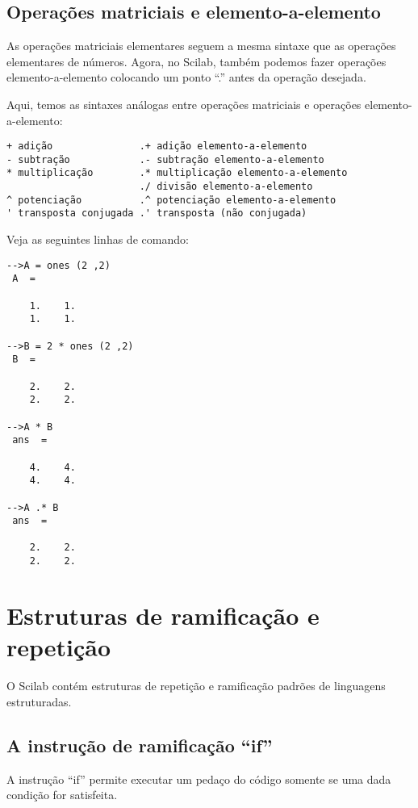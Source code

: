 \subsection{Operações matriciais e elemento-a-elemento}

As operações matriciais elementares seguem a mesma sintaxe que as operações elementares de números. Agora, no Scilab, também podemos fazer operações elemento-a-elemento colocando um ponto ``.'' antes da operação desejada.

Aqui, temos as sintaxes análogas entre operações matriciais e operações elemento-a-elemento:
\begin{verbatim}
+ adição               .+ adição elemento-a-elemento
- subtração            .- subtração elemento-a-elemento
* multiplicação        .* multiplicação elemento-a-elemento
                       ./ divisão elemento-a-elemento
^ potenciação          .^ potenciação elemento-a-elemento
' transposta conjugada .' transposta (não conjugada)
\end{verbatim}

\begin{ex}
  Veja as seguintes linhas de comando:
\begin{verbatim}
-->A = ones (2 ,2)
 A  =
 
    1.    1.  
    1.    1.  
 
-->B = 2 * ones (2 ,2)
 B  =
 
    2.    2.  
    2.    2.  
 
-->A * B
 ans  =
 
    4.    4.  
    4.    4.  
 
-->A .* B
 ans  =
 
    2.    2.  
    2.    2.  
\end{verbatim}
\end{ex}

\section{Estruturas de ramificação e repetição}

O Scilab contém estruturas de repetição e ramificação padrões de linguagens estruturadas.

\subsection{A instrução de ramificação ``if''}

A instrução ``if'' permite executar um pedaço do código somente se uma dada condição for satisfeita.

